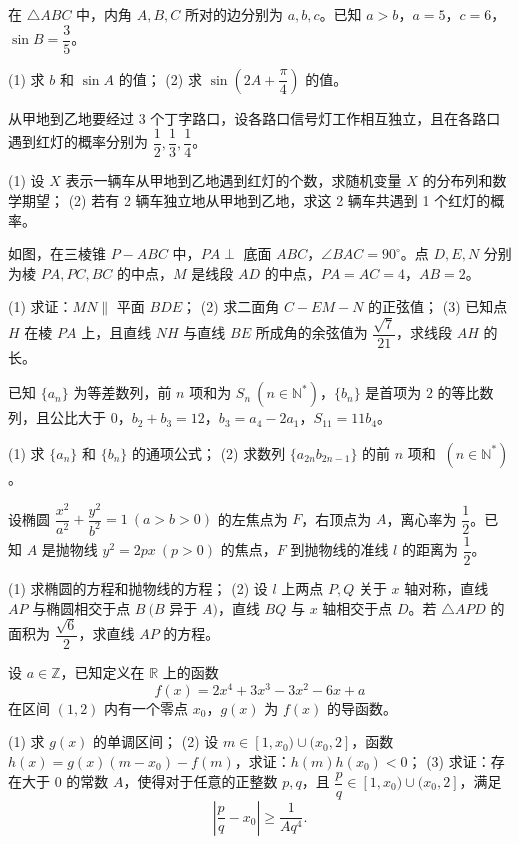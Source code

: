 \begin{question}
在 $\triangle ABC$ 中，内角 $A,B,C$ 所对的边分别为 $a,b,c$。已知 $a>b$，$a=5$，$c=6$，$\sin B=\dfrac35$。

(1)   求 $b$ 和 $\sin A$ 的值；
(2)   求 $\sin\left(2A+\dfrac\pi4\right)$ 的值。

\end{question}
\begin{question}
从甲地到乙地要经过 3 个丁字路口，设各路口信号灯工作相互独立，且在各路口遇到红灯的概率分别为 $\dfrac12,\dfrac13,\dfrac14$。

(1)   设 $X$ 表示一辆车从甲地到乙地遇到红灯的个数，求随机变量 $X$ 的分布列和数学期望；
(2)   若有 2 辆车独立地从甲地到乙地，求这 2 辆车共遇到 1 个红灯的概率。

\Needspace{0.4\textheight}
\end{question}
\begin{question}
如图，在三棱锥 $P-ABC$ 中，$PA\perp$ 底面 $ABC$，$\angle BAC=90^\circ$。点 $D,E,N$ 分别为棱 $PA,PC,BC$ 的中点，$M$ 是线段 $AD$ 的中点，$PA=AC=4$，$AB=2$。
\nopagebreak[4]
\begin{center}\end{center}
\nopagebreak[4]
(1)   求证：$MN\parallel$ 平面 $BDE$；
(2)   求二面角 $C-EM-N$ 的正弦值；
(3)   已知点 $H$ 在棱 $PA$ 上，且直线 $NH$ 与直线 $BE$ 所成角的余弦值为 $\dfrac{\sqrt7}{21}$，求线段 $AH$ 的长。

\end{question}
\begin{question}
已知 $\{a_n\}$ 为等差数列，前 $n$ 项和为 $S_n\ (n\in\mathbb N^*)$，$\{b_n\}$ 是首项为 $2$ 的等比数列，且公比大于 $0$，$b_2+b_3=12$，$b_3=a_4-2a_1$，$S_{11}=11b_4$。

(1)   求 $\{a_n\}$ 和 $\{b_n\}$ 的通项公式；
(2)   求数列 $\{a_{2n}b_{2n-1}\}$ 的前 $n$ 项和 $\ (n\in\mathbb N^*)$。

\end{question}
\begin{question}
设椭圆 $\dfrac{x^2}{a^2}+\dfrac{y^2}{b^2}=1\ (a>b>0)$ 的左焦点为 $F$，右顶点为 $A$，离心率为 $\dfrac12$。已知 $A$ 是抛物线 $y^2=2px\ (p>0)$ 的焦点，$F$ 到抛物线的准线 $l$ 的距离为 $\dfrac12$。

(1)   求椭圆的方程和抛物线的方程；
(2)   设 $l$ 上两点 $P,Q$ 关于 $x$ 轴对称，直线 $AP$ 与椭圆相交于点 $B\ (B$ 异于 $A)$，直线 $BQ$ 与 $x$ 轴相交于点 $D$。若 $\triangle APD$ 的面积为 $\dfrac{\sqrt6}{2}$，求直线 $AP$ 的方程。

\end{question}
\begin{question}
设 $a\in\mathbb Z$，已知定义在 $\mathbb R$ 上的函数
\nopagebreak[4]
\[
f(x)=2x^4+3x^3-3x^2-6x+a
\]
在区间 $(1,2)$ 内有一个零点 $x_0$，$g(x)$ 为 $f(x)$ 的导函数。

(1)   求 $g(x)$ 的单调区间；
(2)   设 $m\in[1,x_0)\cup(x_0,2]$，函数 $h(x)=g(x)(m-x_0)-f(m)$，求证：$h(m)h(x_0)<0$；
(3)   求证：存在大于 $0$ 的常数 $A$，使得对于任意的正整数 $p,q$，且 $\dfrac pq\in[1,x_0)\cup(x_0,2]$，满足
\nopagebreak[4]
\[
\left|\frac pq-x_0\right|\geqslant\frac1{Aq^4}.
\]

\end{question}
